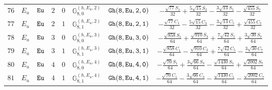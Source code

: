 \documentclass[fleqn,8pt]{jsarticle}
\begin{document}
\begin{table}[ht!]
\begin{center}
\begin{tabular}{cccccccc}
$ 76 $ & $ E_{u} $ & $ {\tt Eu} $ & $ 2 $ & $ 0 $ & $ \mathbb{G}_{8,0}^{(h,E_{u},2)} $ & $ {\tt Gh(8,Eu,2,0)} $ & $ - \frac{\sqrt{77} S_{1}}{32} + \frac{5 \sqrt{15} S_{3}}{32} - \frac{3 \sqrt{13} S_{5}}{32} - \frac{\sqrt{455} S_{7}}{32} $ \\
$ 77 $ & $ E_{u} $ & $ {\tt Eu} $ & $ 2 $ & $ 1 $ & $ \mathbb{G}_{8,1}^{(h,E_{u},2)} $ & $ {\tt Gh(8,Eu,2,1)} $ & $ - \frac{\sqrt{77} C_{1}}{32} - \frac{5 \sqrt{15} C_{3}}{32} - \frac{3 \sqrt{13} C_{5}}{32} + \frac{\sqrt{455} C_{7}}{32} $ \\
$ 78 $ & $ E_{u} $ & $ {\tt Eu} $ & $ 3 $ & $ 0 $ & $ \mathbb{G}_{8,0}^{(h,E_{u},3)} $ & $ {\tt Gh(8,Eu,3,0)} $ & $ - \frac{\sqrt{858} S_{1}}{64} + \frac{\sqrt{910} S_{3}}{64} + \frac{7 \sqrt{42} S_{5}}{64} + \frac{3 \sqrt{30} S_{7}}{64} $ \\
$ 79 $ & $ E_{u} $ & $ {\tt Eu} $ & $ 3 $ & $ 1 $ & $ \mathbb{G}_{8,1}^{(h,E_{u},3)} $ & $ {\tt Gh(8,Eu,3,1)} $ & $ - \frac{\sqrt{858} C_{1}}{64} - \frac{\sqrt{910} C_{3}}{64} + \frac{7 \sqrt{42} C_{5}}{64} - \frac{3 \sqrt{30} C_{7}}{64} $ \\
$ 80 $ & $ E_{u} $ & $ {\tt Eu} $ & $ 4 $ & $ 0 $ & $ \mathbb{G}_{8,0}^{(h,E_{u},4)} $ & $ {\tt Gh(8,Eu,4,0)} $ & $ - \frac{\sqrt{70} S_{1}}{64} + \frac{3 \sqrt{66} S_{3}}{64} - \frac{\sqrt{1430} S_{5}}{64} + \frac{\sqrt{2002} S_{7}}{64} $ \\
$ 81 $ & $ E_{u} $ & $ {\tt Eu} $ & $ 4 $ & $ 1 $ & $ \mathbb{G}_{8,1}^{(h,E_{u},4)} $ & $ {\tt Gh(8,Eu,4,1)} $ & $ - \frac{\sqrt{70} C_{1}}{64} - \frac{3 \sqrt{66} C_{3}}{64} - \frac{\sqrt{1430} C_{5}}{64} - \frac{\sqrt{2002} C_{7}}{64} $ \\
 \hline \hline
\end{tabular}
\end{center}
\end{table}
\end{document}
